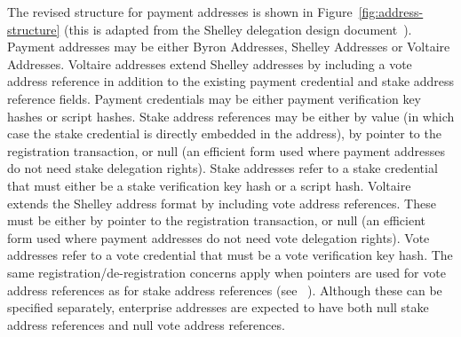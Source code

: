 The revised structure for payment addresses is shown in Figure~\ref{fig:address-structure} (this is adapted from the Shelley delegation design document~\cite{delegation-design}).
Payment addresses may be either Byron Addresses, Shelley Addresses or Voltaire Addresses.
Voltaire addresses extend Shelley addresses by including a vote address reference in addition to the existing payment credential and stake address
reference fields.  Payment credentials may be either payment verification key hashes or script hashes.  Stake address references may be either
by value (in which case the stake credential is directly embedded in the address), by pointer to the registration transaction, or null (an efficient
form used where payment addresses do not need stake delegation rights).
Stake addresses refer to a stake credential that must either be a stake verification key hash or a script hash.
Voltaire extends the Shelley address format by including vote address references.  These must be either by pointer to the registration transaction, or null (an efficient
form used where payment addresses do not need vote delegation rights).
Vote addresses refer to a vote credential that must be a vote verification key hash.
The same registration/de-registration concerns apply when pointers are used for vote address references as for stake address references (see ~\cite{delegation-design}).
Although these can be specified separately, enterprise addresses are expected to have both null stake address references and null vote address references.

